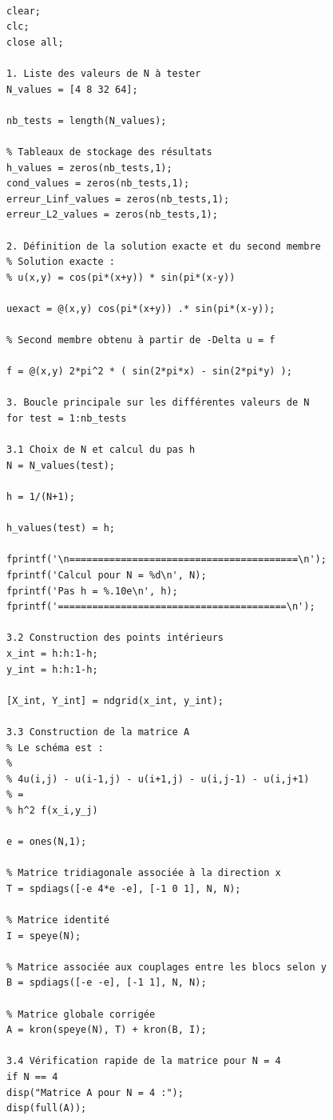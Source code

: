 \documentclass[12pt,a4paper]{article}
\begin{document}
\begin{lstlisting}[style=matlabstyle, caption={Code MATLAB utilisé pour la résolution numérique du problème de Poisson.}, label={code:matlab_poisson}]

clear;
clc;
close all;

1. Liste des valeurs de N à tester
N_values = [4 8 32 64];

nb_tests = length(N_values);

% Tableaux de stockage des résultats
h_values = zeros(nb_tests,1);
cond_values = zeros(nb_tests,1);
erreur_Linf_values = zeros(nb_tests,1);
erreur_L2_values = zeros(nb_tests,1);

2. Définition de la solution exacte et du second membre
% Solution exacte :
% u(x,y) = cos(pi*(x+y)) * sin(pi*(x-y))

uexact = @(x,y) cos(pi*(x+y)) .* sin(pi*(x-y));

% Second membre obtenu à partir de -Delta u = f

f = @(x,y) 2*pi^2 * ( sin(2*pi*x) - sin(2*pi*y) );

3. Boucle principale sur les différentes valeurs de N
for test = 1:nb_tests

3.1 Choix de N et calcul du pas h
N = N_values(test);

h = 1/(N+1);

h_values(test) = h;

fprintf('\n========================================\n');
fprintf('Calcul pour N = %d\n', N);
fprintf('Pas h = %.10e\n', h);
fprintf('========================================\n');

3.2 Construction des points intérieurs
x_int = h:h:1-h;
y_int = h:h:1-h;

[X_int, Y_int] = ndgrid(x_int, y_int);

3.3 Construction de la matrice A
% Le schéma est :
%
% 4u(i,j) - u(i-1,j) - u(i+1,j) - u(i,j-1) - u(i,j+1)
% =
% h^2 f(x_i,y_j)

e = ones(N,1);

% Matrice tridiagonale associée à la direction x
T = spdiags([-e 4*e -e], [-1 0 1], N, N);

% Matrice identité
I = speye(N);

% Matrice associée aux couplages entre les blocs selon y
B = spdiags([-e -e], [-1 1], N, N);

% Matrice globale corrigée
A = kron(speye(N), T) + kron(B, I);

3.4 Vérification rapide de la matrice pour N = 4
if N == 4
disp("Matrice A pour N = 4 :");
disp(full(A));


\end{lstlisting}
\end{document}
